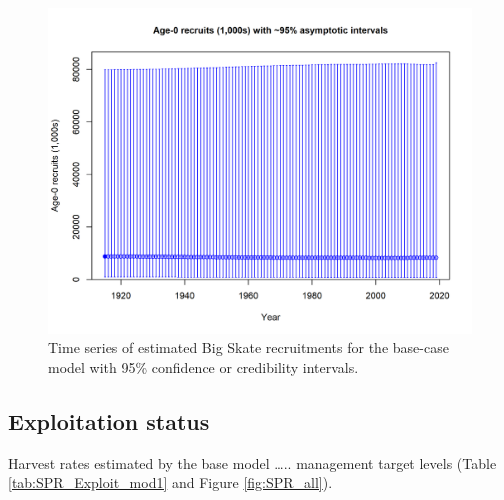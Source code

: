 \documentclass[12pt,]{article}
\begin{document}
\FloatBarrier

\begin{figure}
\centering
\includegraphics{r4ss/plots_mod1/ts11_Age-0_recruits_(1000s)_with_95_asymptotic_intervals.png}
\caption{Time series of estimated Big Skate recruitments for the
base-case model with 95\% confidence or credibility intervals.
\label{fig:Recruits_all}}
\end{figure}

\FloatBarrier

\hypertarget{exploitation-status}{%
\subsection*{Exploitation status}\label{exploitation-status}}

Harvest rates estimated by the base model \ldots{}.. management target
levels (Table \ref{tab:SPR_Exploit_mod1} and Figure \ref{fig:SPR_all}).

\FloatBarrier
\end{document}
